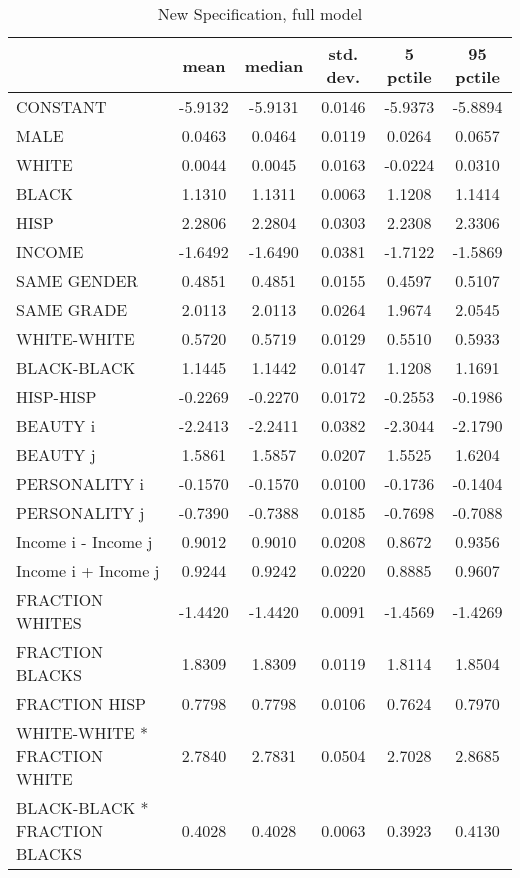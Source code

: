 \documentclass[12pt,letterpaper]{article}
\begin{document}
\begin{small}
\begin{table}[ht]
\caption{New Specification, full model}
\centering
\begin{tabular}{l|ccccc}
  \hline
 & mean & median & std. dev. & 5 pctile & 95 pctile \\ 
  \hline
CONSTANT & -5.9132 & -5.9131 & 0.0146 & -5.9373 & -5.8894 \\ 
  MALE & 0.0463 & 0.0464 & 0.0119 & 0.0264 & 0.0657 \\ 
  WHITE & 0.0044 & 0.0045 & 0.0163 & -0.0224 & 0.0310 \\ 
  BLACK & 1.1310 & 1.1311 & 0.0063 & 1.1208 & 1.1414 \\ 
  HISP & 2.2806 & 2.2804 & 0.0303 & 2.2308 & 2.3306 \\ 
  INCOME & -1.6492 & -1.6490 & 0.0381 & -1.7122 & -1.5869 \\ 
  SAME GENDER & 0.4851 & 0.4851 & 0.0155 & 0.4597 & 0.5107 \\ 
  SAME GRADE & 2.0113 & 2.0113 & 0.0264 & 1.9674 & 2.0545 \\ 
  WHITE-WHITE & 0.5720 & 0.5719 & 0.0129 & 0.5510 & 0.5933 \\ 
  BLACK-BLACK & 1.1445 & 1.1442 & 0.0147 & 1.1208 & 1.1691 \\ 
  HISP-HISP & -0.2269 & -0.2270 & 0.0172 & -0.2553 & -0.1986 \\ 
  BEAUTY i & -2.2413 & -2.2411 & 0.0382 & -2.3044 & -2.1790 \\ 
  BEAUTY j & 1.5861 & 1.5857 & 0.0207 & 1.5525 & 1.6204 \\ 
  PERSONALITY i & -0.1570 & -0.1570 & 0.0100 & -0.1736 & -0.1404 \\ 
  PERSONALITY j & -0.7390 & -0.7388 & 0.0185 & -0.7698 & -0.7088 \\ 
  Income i - Income j & 0.9012 & 0.9010 & 0.0208 & 0.8672 & 0.9356 \\ 
  Income i + Income j & 0.9244 & 0.9242 & 0.0220 & 0.8885 & 0.9607 \\ 
  FRACTION WHITES & -1.4420 & -1.4420 & 0.0091 & -1.4569 & -1.4269 \\ 
  FRACTION BLACKS & 1.8309 & 1.8309 & 0.0119 & 1.8114 & 1.8504 \\ 
  FRACTION HISP & 0.7798 & 0.7798 & 0.0106 & 0.7624 & 0.7970 \\ 
  WHITE-WHITE * FRACTION WHITE & 2.7840 & 2.7831 & 0.0504 & 2.7028 & 2.8685 \\ 
  BLACK-BLACK * FRACTION BLACKS & 0.4028 & 0.4028 & 0.0063 & 0.3923 & 0.4130 \\ 

\end{tabular}
\end{table}
\end{small}
\end{document}
